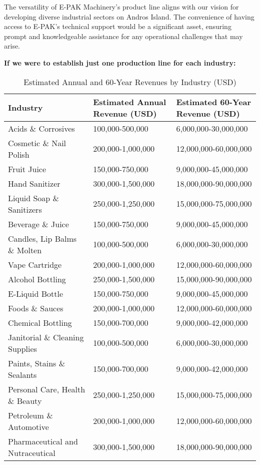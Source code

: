 \documentclass{article}
\begin{document}
The versatility of E-PAK Machinery's product line aligns with our vision for developing diverse industrial sectors on Andros Island. The convenience of having access to E-PAK's technical support would be a significant asset, ensuring prompt and knowledgeable assistance for any operational challenges that may arise.\par
\textbf{If we were to establish just one production line for each industry:}
\begin{table}[h]
\centering
\caption{Estimated Annual and 60-Year Revenues by Industry (USD)}
{\small %
\begin{tabular}{|l|l|l|}
\hline 
\textbf{Industry} & \textbf{Estimated Annual Revenue (USD)} & \textbf{Estimated 60-Year Revenue (USD)} \\
\hline 
Acids \& Corrosives & 100,000-500,000 & 6,000,000-30,000,000 \\
Cosmetic \& Nail Polish & 200,000-1,000,000 & 12,000,000-60,000,000 \\
Fruit Juice & 150,000-750,000 & 9,000,000-45,000,000 \\
Hand Sanitizer & 300,000-1,500,000 & 18,000,000-90,000,000 \\
Liquid Soap \& Sanitizers & 250,000-1,250,000 & 15,000,000-75,000,000 \\
Beverage \& Juice & 150,000-750,000 & 9,000,000-45,000,000 \\
Candles, Lip Balms \& Molten & 100,000-500,000 & 6,000,000-30,000,000 \\
Vape Cartridge & 200,000-1,000,000 & 12,000,000-60,000,000 \\
Alcohol Bottling & 250,000-1,500,000 & 15,000,000-90,000,000 \\
E-Liquid Bottle & 150,000-750,000 & 9,000,000-45,000,000 \\
Foods \& Sauces & 200,000-1,000,000 & 12,000,000-60,000,000 \\
Chemical Bottling & 150,000-700,000 & 9,000,000-42,000,000 \\
Janitorial \& Cleaning Supplies & 100,000-500,000 & 6,000,000-30,000,000 \\
Paints, Stains \& Sealants & 150,000-700,000 & 9,000,000-42,000,000 \\
Personal Care, Health \& Beauty & 250,000-1,250,000 & 15,000,000-75,000,000 \\
Petroleum \& Automotive & 200,000-1,000,000 & 12,000,000-60,000,000 \\
Pharmaceutical and Nutraceutical & 300,000-1,500,000 & 18,000,000-90,000,000 \\
\hline
\end{tabular}
}
\end{table}
\end{document}
